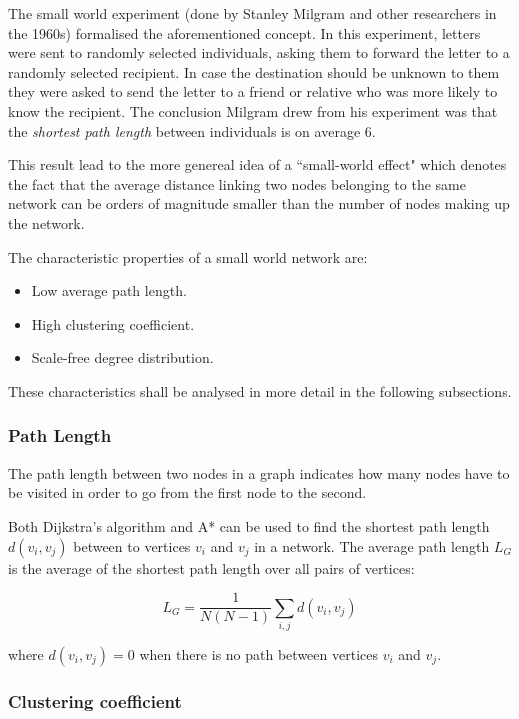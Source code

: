 \documentclass[a4paper,11pt,titlepage]{article}
\begin{document}
The small world experiment (done by Stanley Milgram and other researchers in the
1960s) formalised the aforementioned concept. In this experiment, letters were
sent to randomly selected individuals, asking them to forward the letter to a
randomly selected recipient. In case the destination should be unknown to them
they were asked to send the letter to a friend or
relative who was more likely to know the recipient.
The conclusion Milgram drew from his experiment was that the
\emph{shortest path length} between individuals is on average $6$.

This result lead to the more genereal idea of a ``small-world effect" which
denotes the fact that the average distance linking two nodes belonging to the
same network can be orders of magnitude smaller than the number of nodes making
up the network. \cite{complexAdapt}

The characteristic properties of a small world network are:

\begin{itemize}
\item Low average path length.
\item High clustering coefficient.
\item Scale-free degree distribution.
\end{itemize}

These characteristics shall be analysed in more detail in the following subsections.

\subsubsection{Path Length}

The path length between two nodes in a graph indicates how many nodes
have to be visited in order to go from the first node to the second.

Both Dijkstra's algorithm and A* can be used to find the shortest path length
$d(v_i, v_j)$ between to vertices $v_i$ and $v_j$ in a network. The average
path length $L_G$ is the average of the shortest path length over all pairs of
vertices:

\[ L_G = \frac{1}{N(N-1)} \sum_{i, j} d(v_i, v_j) \]

where $d(v_i, v_j) = 0$ when there is no path between vertices $v_i$ and $v_j$.

\subsubsection{Clustering coefficient}
\end{document}
